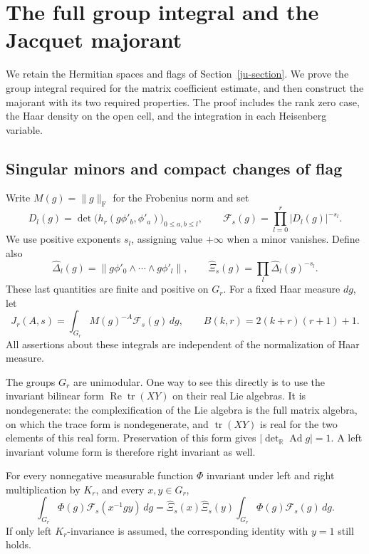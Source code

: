 \section{The full group integral and the Jacquet majorant}
\label{jm-section}

We retain the Hermitian spaces and flags of
Section~\ref{ju-section}.  We prove the group integral required
for the matrix coefficient estimate, and then construct the
majorant with its two required properties.
The proof includes the rank zero case, the Haar density on the
open cell, and the integration in each Heisenberg variable.

\subsection{Singular minors and compact changes of flag}

Write \(M(g)=\|g\|_{\mathrm F}\) for the Frobenius norm and set
\[
 D_l(g)=\det\bigl(h_r(g\phi'_b,\phi'_a)\bigr)_{0\leq a,b\leq l},
 \qquad
 \mathcal F_s(g)=\prod_{l=0}^{r}|D_l(g)|^{-s_l}.
\]
We use positive exponents \(s_l\), assigning value \(+\infty\)
when a minor vanishes.  Define also
\[
 \widehat\Delta_l(g)=
       \|g\phi'_0\wedge\cdots\wedge g\phi'_l\|,
 \qquad
 \widehat\Xi_s(g)=\prod_l\widehat\Delta_l(g)^{-s_l}.
\]
These last quantities are finite and positive on \(G_r\).
For a fixed Haar measure \(dg\), let
\[
 J_r(A,s)=\int_{G_r}M(g)^{-A}\mathcal F_s(g)\,dg,\qquad
 B(k,r)=2(k+r)(r+1)+1.
\]
All assertions about these integrals are independent of the
normalization of Haar measure.

The groups \(G_r\) are unimodular.  One way to see this directly
is to use the invariant bilinear form
\(\operatorname{Re}\operatorname{tr}(XY)\) on their real Lie
algebras.  It is nondegenerate: the complexification of the
Lie algebra is the full matrix algebra, on which the trace
form is nondegenerate, and \(\operatorname{tr}(XY)\) is real
for the two elements of this real form.
Preservation of this form gives
\(|\det_{\mathbb R}\operatorname{Ad}g|=1\).
A left invariant volume form is therefore right invariant
as well.

\begin{lemma}\label{jm-compact-factor}
For every nonnegative measurable function \(\Phi\) invariant
under left and right multiplication by \(K_r\), and every
\(x,y\in G_r\),
\begin{equation}\label{jm-both}
 \int_{G_r}\Phi(g)\mathcal F_s(x^{-1}gy)\,dg
  =\widehat\Xi_s(x)\widehat\Xi_s(y)
                        \int_{G_r}\Phi(g)\mathcal F_s(g)\,dg .
\end{equation}
If only left \(K_r\)-invariance is assumed, the corresponding
identity with \(y=1\) still holds.
\end{lemma}

